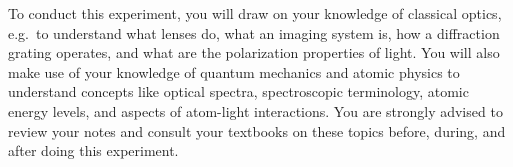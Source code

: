 \documentclass{../lab}
\begin{document}
To conduct this experiment, you will draw on your knowledge of classical optics, e.g.\ to understand what lenses do, what an imaging system is, how a diffraction grating operates, and what are the polarization properties of light.  You will also make use of your knowledge of quantum mechanics and atomic physics to understand concepts like optical spectra, spectroscopic terminology, atomic energy levels, and aspects of atom-light interactions.  You are strongly advised to review your notes and consult your textbooks on these topics before, during, and after doing this experiment.%






\end{document}
